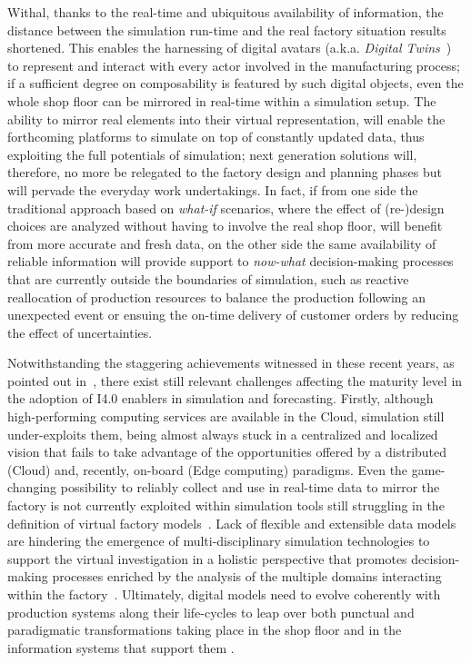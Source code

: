Withal, thanks to the real-time and ubiquitous availability of information, the distance between the simulation run-time and the real factory situation results shortened. 
This enables the harnessing of digital avatars (a.k.a. \textit{Digital Twins}~\cite{Uhlemann2017}) to represent and interact with every actor involved in the manufacturing process; if a sufficient degree on composability is featured by such digital objects, even the whole shop floor can be mirrored in real-time within a simulation setup.   
The ability to mirror real elements into their virtual representation, will enable the forthcoming platforms to simulate on top of constantly updated data, thus exploiting the full potentials of simulation; next generation solutions will, therefore, no more be relegated to the factory design and planning phases but will pervade the everyday work undertakings.
In fact, if from one side the traditional approach based on \textit{what-if} scenarios, where the effect of (re-)design choices are analyzed without having to involve the real shop floor, will benefit from more accurate and fresh data, on the other side the same availability of reliable information will provide support to \textit{now-what} decision-making processes that are currently outside the boundaries of simulation, such as reactive reallocation of production resources to balance the production following an unexpected event or ensuing the on-time delivery of customer orders by reducing the effect of uncertainties.


Notwithstanding the staggering achievements witnessed in these recent years, as pointed out in~\cite{pedrazzoli2014simulation}, there exist still relevant challenges affecting the maturity level in the adoption of I4.0 enablers in simulation and forecasting. 
Firstly, although high-performing computing services are available in the Cloud, simulation still under-exploits them, being almost always stuck in a centralized and localized vision that fails to take advantage of the opportunities offered by a distributed (Cloud) and, recently, on-board (Edge computing) paradigms.
Even the game-changing possibility to reliably collect and use in real-time data to mirror the factory is not currently exploited within simulation tools still struggling in the definition of virtual factory models~\cite{ciavotta2017microservice}.
Lack of flexible and extensible data models are hindering the emergence of multi-disciplinary simulation technologies to support the virtual investigation in a holistic perspective that promotes decision-making processes enriched by the analysis of the multiple domains interacting within the factory~\cite{hehenberger2016design}.
Ultimately, digital models need to evolve coherently with production systems along their life-cycles to leap over both punctual and paradigmatic transformations taking place in the shop floor and in the  information systems that support them \cite{azab2012simulation}.

